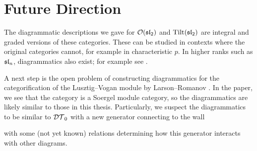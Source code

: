 \chapter{Future Direction}
\label{chapter:future-direction}

The diagrammatic descriptions we gave for $\mathcal{O}(\operatorname{\mathfrak{sl}}_2)$ and $\operatorname{Tilt}(\operatorname{\mathfrak{sl}}_2)$ are integral and graded versions of these categories. These can be studied in contexts where the original categories cannot, for example in characteristic $p$. In higher ranks such as $\operatorname{\mathfrak{sl}}_n$, diagrammatics also exist; for example see \cite{riche-williamson-tilt-modules-p-canon-basis}.

A next step is the open problem of constructing diagrammatics for the categorification of the Lusztig--Vogan module by Larson--Romanov \cite{categorification-lusztig-vogan-module}. In the paper, we see that the category is a Soergel module category, so the diagrammatics are likely similar to those in this thesis. Particularly, we suspect the diagrammatics to be similar to $\mathcal{DT}_0$ with a new generator connecting to the wall
\begin{center}
\end{center}
with some (not yet known) relations determining how this generator interacts with other diagrams.

